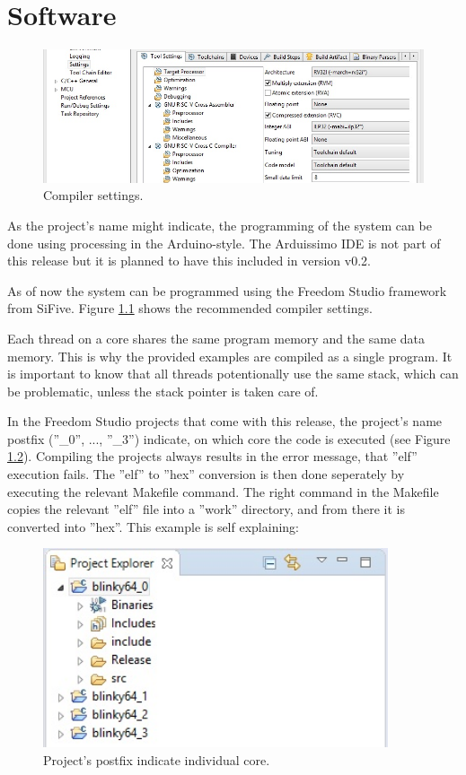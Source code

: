 \chapter{Software}
\label{atomics}

\begin{figure}[!t]
	\centering
	\includegraphics[width=7in]{figs/setting}
	\caption{Compiler settings.}
	\label{Compiler_setting}
\end{figure}

As the project's name might indicate, the programming of the system can be done using processing in the Arduino-style. The Arduissimo IDE is not part of this release but it is planned to have this included in version v0.2. 

As of now the system can be programmed using the Freedom Studio framework from SiFive. Figure \ref{Compiler_setting} shows the recommended compiler settings.

Each thread on a core shares the same program memory and the same data memory. This is why the provided examples are compiled as a single program. It is important to know that all threads potentionally use the same stack, which can be problematic, unless the stack pointer is taken care of.

In the Freedom Studio projects that come with this release, the project's name postfix (''\_0'', ..., ''\_3'') indicate, on which core the code is executed (see Figure \ref{postfix}). Compiling the projects always results in the error message, that ''elf'' execution fails. The ''elf'' to ''hex'' conversion is then done seperately by executing the relevant Makefile command. The right command in the Makefile copies the relevant ''elf'' file into a ''work'' directory, and from there it is converted into ''hex''. This example is self explaining:

\begin{figure}[!t]
	\centering
	\includegraphics[width=4in]{figs/projects_postfix}
	\caption{Project's postfix indicate individual core.}
	\label{postfix}
\end{figure}

